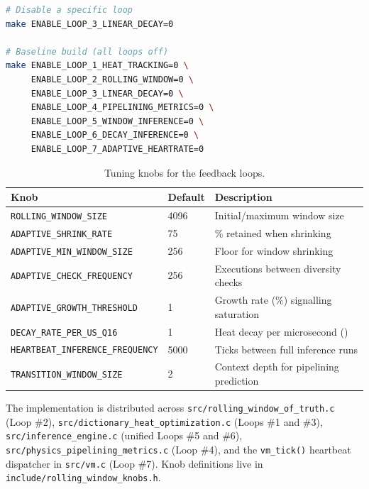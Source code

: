 \begin{lstlisting}[language=bash]
# Disable a specific loop
make ENABLE_LOOP_3_LINEAR_DECAY=0

# Baseline build (all loops off)
make ENABLE_LOOP_1_HEAT_TRACKING=0 \
     ENABLE_LOOP_2_ROLLING_WINDOW=0 \
     ENABLE_LOOP_3_LINEAR_DECAY=0 \
     ENABLE_LOOP_4_PIPELINING_METRICS=0 \
     ENABLE_LOOP_5_WINDOW_INFERENCE=0 \
     ENABLE_LOOP_6_DECAY_INFERENCE=0 \
     ENABLE_LOOP_7_ADAPTIVE_HEARTRATE=0
\end{lstlisting}

\begin{table}[ht]
\centering
\small
\begin{tabular}{lll}
\toprule
Knob & Default & Description \\
\midrule
\texttt{ROLLING\_WINDOW\_SIZE} & 4096 & Initial/maximum window size \\
\texttt{ADAPTIVE\_SHRINK\_RATE} & 75 & \% retained when shrinking \\
\texttt{ADAPTIVE\_MIN\_WINDOW\_SIZE} & 256 & Floor for window shrinking \\
\texttt{ADAPTIVE\_CHECK\_FREQUENCY} & 256 & Executions between diversity checks \\
\texttt{ADAPTIVE\_GROWTH\_THRESHOLD} & 1 & Growth rate (\%) signalling saturation \\
\texttt{DECAY\_RATE\_PER\_US\_Q16} & 1 & Heat decay per microsecond (\Qtype{}) \\
\texttt{HEARTBEAT\_INFERENCE\_FREQUENCY} & 5000 & Ticks between full inference runs \\
\texttt{TRANSITION\_WINDOW\_SIZE} & 2 & Context depth for pipelining prediction \\
\bottomrule
\end{tabular}
\caption{Tuning knobs for the feedback loops.}
\end{table}

The implementation is distributed across
\texttt{src/rolling\_window\_of\_truth.c} (Loop \#2),
\texttt{src/dictionary\_heat\_optimization.c} (Loops \#1 and \#3),
\texttt{src/inference\_engine.c} (unified Loops \#5 and \#6),
\texttt{src/physics\_pipelining\_metrics.c} (Loop \#4), and the \texttt{vm\_tick()}
heartbeat dispatcher in \texttt{src/vm.c} (Loop \#7). Knob definitions live in
\texttt{include/rolling\_window\_knobs.h}.
